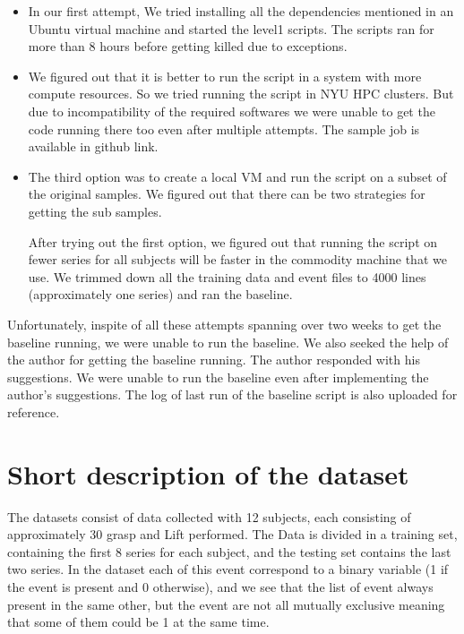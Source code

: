 \documentclass[]{article}
\begin{document}
\begin{itemize}
  \item In our first attempt, We tried installing all the dependencies mentioned in an Ubuntu virtual machine and started the level1 scripts.  The scripts ran for more than 8 hours before getting killed due to exceptions.
  \item We figured out that it is better to run the script in a system with more compute resources.  So we tried running the script in NYU HPC clusters.  But due to incompatibility of the required softwares we were unable to get the code running there too even after multiple attempts.  The sample job is available in github link\cite{hpcjob}.
  \item The third option was to create a local VM and run the script on a subset of the original samples.  We figured out that there can be two strategies for getting the sub samples.  
    After trying out the first option, we figured out that running the script on fewer series for all subjects will be faster in the commodity machine that we use.  We trimmed down all the training data and event files to 4000 lines (approximately one series) and ran the baseline.  
\end{itemize}

Unfortunately, inspite of all these attempts spanning over two weeks to get the baseline running, we were unable to run the baseline.  We also seeked the help of the author for getting the baseline running.  The author responded with his suggestions.  We were unable to run the baseline even after implementing the author's suggestions\cite{orurepo}.  The log of last run of the baseline script is also uploaded for reference\cite{runlog}.

\section{Short description of the dataset}
The  datasets consist of data collected with 12 subjects, each consisting of approximately 30 grasp and Lift performed. The Data is divided in a training set, containing the first 8 series for each subject, and  the testing set contains the last two series.
In the dataset each of this event correspond to a binary variable (1 if the event is present and 0 otherwise), and we see that the list of event always present in the same other, but the event are not all mutually exclusive meaning that some of  them could be 1 at the same time.  
\end{document}

